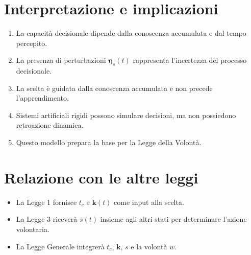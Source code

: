 \documentclass[12pt,a4paper]{article}
\begin{document}
\caption*{Curva concettuale della scelta $s$ in funzione del tempo percepito $t_c$.}

\section{Interpretazione e implicazioni}
\begin{enumerate}
\item La capacità decisionale dipende dalla conoscenza accumulata e dal tempo percepito.
\item La presenza di perturbazioni $\bm{\eta}_s(t)$ rappresenta l’incertezza del processo decisionale.
\item La scelta è guidata dalla conoscenza accumulata e non precede l’apprendimento.
\item Sistemi artificiali rigidi possono simulare decisioni, ma non possiedono retroazione dinamica.
\item Questo modello prepara la base per la Legge della Volontà.
\end{enumerate}

\section{Relazione con le altre leggi}
\begin{itemize}
\item La Legge 1 fornisce $t_c$ e $\bm{k}(t)$ come input alla scelta.
\item La Legge 3 riceverà $s(t)$ insieme agli altri stati per determinare l’azione volontaria.
\item La Legge Generale integrerà $t_c$, $\bm{k}$, $s$ e la volontà $w$.
\end{itemize}
\end{document}
